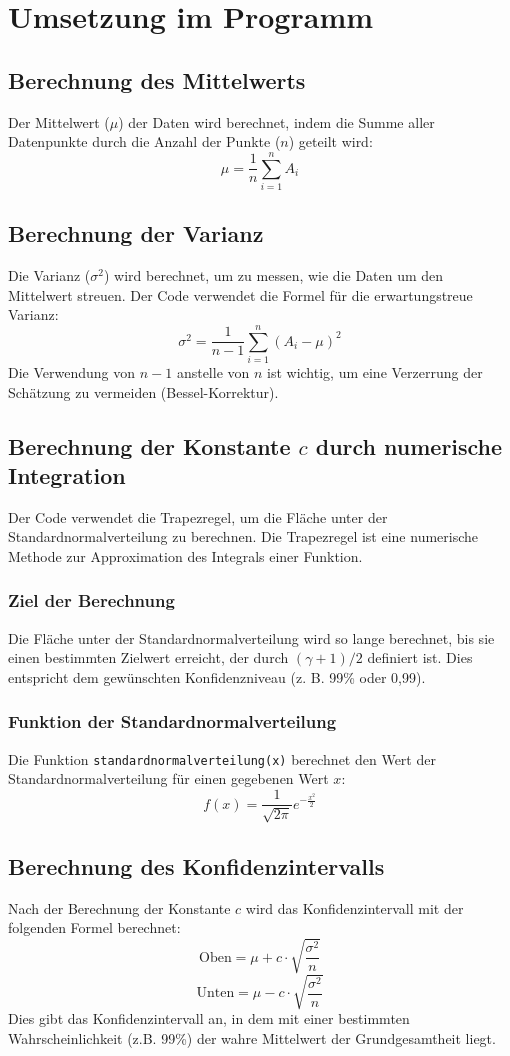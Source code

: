 
\section{Umsetzung im Programm}
\label{sec:umsetzung_im_programm}

\subsection{Berechnung des Mittelwerts}
Der Mittelwert (\(\mu\)) der Daten wird berechnet, indem die Summe aller Datenpunkte durch die Anzahl der Punkte (\(n\)) geteilt wird:
\[
\mu = \frac{1}{n} \sum_{i=1}^{n} A_i
\]

\subsection{Berechnung der Varianz}
Die Varianz (\(\sigma^2\)) wird berechnet, um zu messen, wie die Daten um den Mittelwert streuen. Der Code verwendet die Formel für die erwartungstreue Varianz:
\[
\sigma^2 = \frac{1}{n-1} \sum_{i=1}^{n} (A_i - \mu)^2
\]
Die Verwendung von \(n-1\) anstelle von \(n\) ist wichtig, um eine Verzerrung der Schätzung zu vermeiden (Bessel-Korrektur).

\subsection{Berechnung der Konstante \(c\) durch numerische Integration}
Der Code verwendet die Trapezregel, um die Fläche unter der Standardnormalverteilung zu berechnen. Die Trapezregel ist eine numerische Methode zur Approximation des Integrals einer Funktion.

\subsubsection{Ziel der Berechnung}
Die Fläche unter der Standardnormalverteilung wird so lange berechnet, bis sie einen bestimmten Zielwert erreicht, der durch \((\gamma + 1) / 2\) definiert ist. Dies entspricht dem gewünschten Konfidenzniveau (z. B. 99\% oder 0,99).

\subsubsection{Funktion der Standardnormalverteilung}
Die Funktion \texttt{standardnormalverteilung(x)} berechnet den Wert der Standardnormalverteilung für einen gegebenen Wert \(x\):
\[
f(x) = \frac{1}{\sqrt{2\pi}} e^{-\frac{x^2}{2}}
\]

\subsection{Berechnung des Konfidenzintervalls}
Nach der Berechnung der Konstante \(c\) wird das Konfidenzintervall mit der folgenden Formel berechnet:
\[
\text{Oben} = \mu + c \cdot \sqrt{\frac{\sigma^2}{n}}
\]
\[
\text{Unten} = \mu - c \cdot \sqrt{\frac{\sigma^2}{n}}
\]
Dies gibt das Konfidenzintervall an, in dem mit einer bestimmten Wahrscheinlichkeit (z.B. 99\%) der wahre Mittelwert der Grundgesamtheit liegt.


